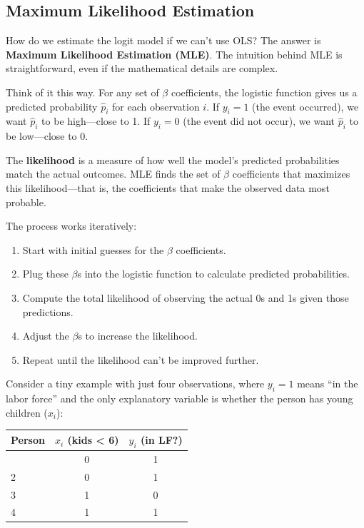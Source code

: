 \documentclass[
  letterpaper,
  DIV=11,
  numbers=noendperiod]{scrreprt}
\newcounter{none} %
\providecommand{\tightlist}{%
  \setlength{\itemsep}{0pt}\setlength{\parskip}{0pt}}
\begin{document}
\subsection{Maximum Likelihood
Estimation}\label{maximum-likelihood-estimation}

How do we estimate the logit model if we can't use OLS? The answer is
\textbf{Maximum Likelihood Estimation (MLE)}. The intuition behind MLE
is straightforward, even if the mathematical details are complex.

Think of it this way. For any set of \(\beta\) coefficients, the
logistic function gives us a predicted probability \(\hat{p}_i\) for
each observation \(i\). If \(y_i = 1\) (the event occurred), we want
\(\hat{p}_i\) to be high---close to 1. If \(y_i = 0\) (the event did not
occur), we want \(\hat{p}_i\) to be low---close to 0.

The \textbf{likelihood} is a measure of how well the model's predicted
probabilities match the actual outcomes. MLE finds the set of \(\beta\)
coefficients that maximizes this likelihood---that is, the coefficients
that make the observed data most probable.

The process works iteratively:

\begin{enumerate}
\def\labelenumi{\arabic{enumi}.}
\tightlist
\item
  Start with initial guesses for the \(\beta\) coefficients.
\item
  Plug these \(\beta\)s into the logistic function to calculate
  predicted probabilities.
\item
  Compute the total likelihood of observing the actual 0s and 1s given
  those predictions.
\item
  Adjust the \(\beta\)s to increase the likelihood.
\item
  Repeat until the likelihood can't be improved further.
\end{enumerate}

Consider a tiny example with just four observations, where \(y_i = 1\)
means ``in the labor force'' and the only explanatory variable is
whether the person has young children (\(x_i\)):

{\def\LTcaptype{none} %
\begin{longtable}[]{@{}lcc@{}}
\toprule\noalign{}
Person & \(x_i\) (kids \textless{} 6) & \(y_i\) (in LF?) \\
\midrule\noalign{}
\endhead
\bottomrule\noalign{}
\endlastfoot
1 & 0 & 1 \\
2 & 0 & 1 \\
3 & 1 & 0 \\
4 & 1 & 1 \\
\end{longtable}
}
\end{document}
